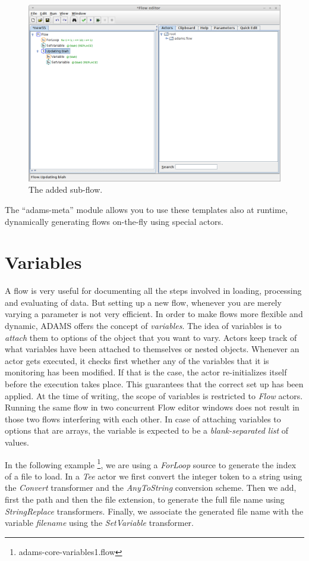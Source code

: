 \begin{figure}[htb]
  \centering
  \includegraphics[width=12.0cm]{images/template-static_use3.png}
  \caption{The added sub-flow.}
  \label{template-static_use3}
\end{figure}
The ``adams-meta'' module allows you to use these templates also at runtime,
dynamically generating flows on-the-fly using special actors.

\newpage
\section{Variables}
\label{variables}
A flow is very useful for documenting all the steps involved in loading,
processing and evaluating of data. But setting up a new flow, whenever you are
merely varying a parameter is not very efficient. In order to make flows more
flexible and dynamic, ADAMS offers the concept of \textit{variables}. The
idea of variables is to \textit{attach} them to options of the object that you
want to vary. Actors keep track of what variables have been attached to
themselves or nested objects. Whenever an actor gets executed, it checks first
whether any of the variables that it is monitoring has been modified. If that is
the case, the actor re-initializes itself before the execution takes place. This
guarantees that the correct set up has been applied. At the time of writing,
the scope of variables is restricted to \textit{Flow} actors. Running the same
flow in two concurrent Flow editor windows does not result in those two flows interfering
with each other. In case of attaching variables to options that are arrays,
the variable is expected to be a \textit{blank-separated list} of values.

In the following example \footnote{adams-core-variables1.flow}, we are using a
\textit{ForLoop} source to generate the index of a file to load. In a
\textit{Tee} actor we first convert the integer token to a string using the
\textit{Convert} transformer and the \textit{AnyToString} conversion scheme.
Then we add, first the path and then the file extension, to generate the full
file name using \textit{StringReplace} transformers. Finally, we associate
the generated file name with the variable \textit{filename} using the
\textit{SetVariable} transformer.

